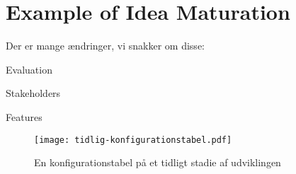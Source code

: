 \section{Example of Idea Maturation}

Der er mange ændringer, vi snakker om disse:

Evaluation

Stakeholders

Features


\begin{figure}
	\texttt{[image: tidlig-konfigurationstabel.pdf]}
	\caption{En konfigurationstabel på et tidligt stadie af udviklingen}
	\label{tab:tidligKonfigurationsTabel}
\end{figure}